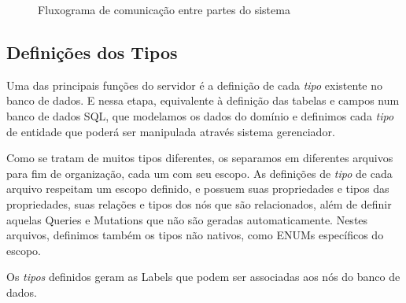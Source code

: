 \begin{figure}[H]

\caption{Fluxograma de comunicação entre partes do sistema }
\label{chap3:fluxograma}
\end{figure}

\subsection{Definições dos Tipos}

Uma das principais funções do servidor é a definição de cada \textit{tipo} existente no banco de dados. E nessa etapa, equivalente à definição das tabelas e campos num banco de dados SQL, que modelamos os dados do domínio e definimos cada \textit{tipo} de entidade que poderá ser manipulada através sistema gerenciador.

Como se tratam de muitos tipos diferentes, os separamos em diferentes arquivos para fim de organização, cada um com seu escopo. As definições de \textit{tipo} de cada arquivo respeitam um escopo definido, e possuem suas propriedades e tipos das propriedades, suas relações e tipos dos nós que são relacionados, além de definir aquelas Queries e Mutations que não são geradas automaticamente. Nestes arquivos, definimos também os tipos não nativos, como ENUMs específicos do escopo.

Os \textit{tipos} definidos geram as Labels que podem ser associadas aos nós do banco de dados.

